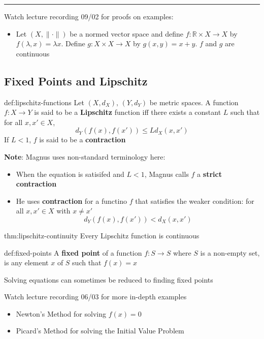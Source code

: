 \documentclass{article}
\begin{document}
\noindent\rule{\textwidth}{0.2pt}
Watch lecture recording 09/02 for proofs on examples:
\begin{itemize}
    \item Let $(X, \lVert  \cdot \rVert)$ be a normed vector space and define $f: \mathbb{R} \times X \to X $ by $f(\lambda, x) = \lambda x$. Define $g: X \times X \to X $ by $g(x,y) = x + y$. $f$ and $g$ are continuous
\end{itemize}


\subsection{Fixed Points and Lipschitz}

\begin{dfn}{def:lipschitz-functions}{}
    Let $(X, d_{X}),\,(Y, d_{Y})$ be metric spaces. A function $f : X \to Y$ is said to be a \textbf{Lipschitz} function iff there exists a constant $L$ such that for all $x,x'\in X$,
    \[d_{Y}(f(x), f(x')) \le L d_{X}(x,x')\]
    If $L < 1$, $f$ is said to be a \textbf{contraction}
\end{dfn}

\textbf{Note}: Magnus uses non-standard terminology here:
\begin{itemize}
    \item When the equation is satisifed and $L < 1$, Magnus calls $f$ a \textbf{strict contraction}
    \item He uses \textbf{contraction} for a functino $f$ that satisfies the weaker condition: for all $x, x' \in X$ with $x \ne x'$
        \[d_{Y}(f(x), f(x')) < d_{X}(x,x')\]
\end{itemize}

\begin{thm}{thm:lipschitz-continuity}{}
    Every Lipschitz function is continuous
\end{thm}

\begin{dfn}{def:fixed-points}{}
    A \textbf{fixed point} of a function $f: S \to S $ where $S$ is a non-empty set, is any element $x$ of $S$ such that $f(x) = x$

    Solving equations can sometimes be reduced to finding fixed points
\end{dfn}

Watch lecture recording 06/03 for more in-depth examples
\begin{itemize}
    \item Newton's Method for solving $f(x) = 0$
    \item Picard's Method for solving the Initial Value Problem
\end{itemize}
\end{document}
